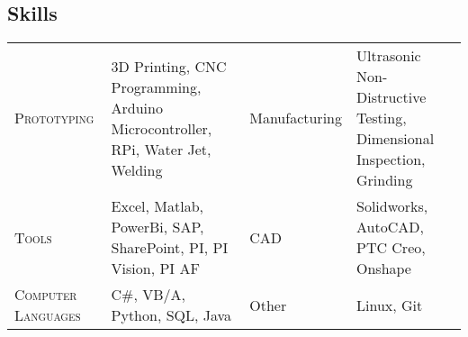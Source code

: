 \documentclass[a4paper, oneside, final, fontsize=9pt, usegeometry]{scrartcl} %
\newcommand{\gray}{\rowcolor[gray]{.90}} %
\newcommand{\Csharp}{C{\lserif\#}}
\begin{document}
\begin{center}


\vspace{-6pt}

\section{Skills}
\begin{tabularx}{0.97\linewidth}{>{\raggedleft\scshape}p{4cm}X|p{2cm}X}
    Prototyping & 3D Printing, CNC Programming, Arduino Microcontroller, RPi, Water Jet, Welding & Manufacturing & Ultrasonic Non-Distructive Testing, Dimensional Inspection, Grinding\\
    Tools & Excel, Matlab, PowerBi, SAP, SharePoint, PI, PI Vision, PI AF & CAD & Solidworks, AutoCAD, PTC Creo, Onshape\\
    Computer Languages & \Csharp{}, VB/A, Python, SQL, Java & Other & Linux, Git\\
\end{tabularx}


\end{center}
\end{document}
